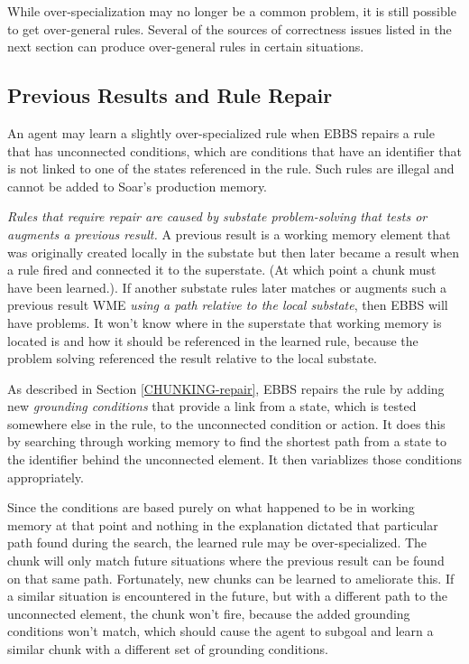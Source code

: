 While over-specialization may no longer be a common problem, it is still possible to get over-general rules.  Several of the sources of correctness issues listed in the next section can produce over-general rules in certain situations.

\subsection{Previous Results and Rule Repair}
\label{CHUNKING-subtleties-repair}

An agent may learn a slightly over-specialized rule when EBBS repairs a rule that has unconnected conditions, which are conditions that have an identifier that is not linked to one of the states referenced in the rule.  Such rules are illegal and cannot be added to Soar's production memory.

\textit{Rules that require repair are caused by substate problem-solving that tests or augments a previous result.}  A previous result is a working memory element that was originally created locally in the substate but then later became a result when a rule fired and connected it to the superstate.  (At which point a chunk must have been learned.). If another substate rules later matches or augments such a previous result WME \emph{using a path relative to the local substate}, then EBBS will have problems.  It won't know where in the superstate that working memory is located is and how it should be referenced in the learned rule, because the problem solving referenced the result relative to the local substate.

As described in Section \ref{CHUNKING-repair}, EBBS repairs the rule by adding new  \textit{grounding conditions} that provide a link from a state, which is tested somewhere else in the rule, to the unconnected condition or action. It does this by searching through working memory to find the shortest path from a state to the identifier behind the unconnected element.  It then variablizes those conditions appropriately.

Since the conditions are based purely on what happened to be in working memory at that point and nothing in the explanation dictated that particular path found during the search, the learned rule may be over-specialized.  The chunk will only match future situations where the previous result can be found on that same path.  Fortunately, new chunks can be learned to ameliorate this.  If a similar situation is encountered in the future, but with a different path to the unconnected element, the chunk won't fire, because the added grounding conditions won't match, which should cause the agent to subgoal and learn a similar chunk with a different set of grounding conditions.

